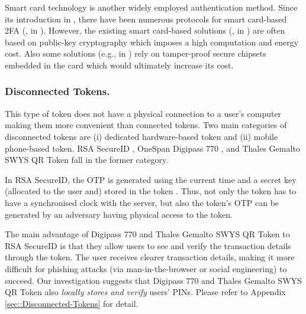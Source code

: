 Smart card technology is another widely employed authentication method. Since its introduction in \cite{chang1991remote}, there have been numerous protocols for smart card-based 2FA (\eg, in \cite{gupta2021machine,WangW18,radhakrishnan2022dependable}). %
%
However, the existing smart card-based solutions (\eg, in \cite{gupta2021machine,WangW18,radhakrishnan2022dependable}) are often based on public-key cryptography which imposes a high computation and energy cost. Also some solutions (e.g., in \cite{kim2009more}) rely on tamper-proof secure chipsets embedded in the card which would ultimately increase its cost. 







\subsubsection{Disconnected Tokens.}

This type of token does not have a physical connection to a user's computer making them more convenient than connected tokens. 
%
%
Two main categories of disconnected tokens are (i) dedicated hardware-based token and (ii) mobile phone-based token. 
%
RSA SecureID \cite{secureID}, OneSpan Digipass 770 \cite{Digipass-website}, and Thales Gemalto SWYS QR Token  \cite{Gemalto} fall in the former category. 



In RSA SecureID, the OTP is generated using the current time and a secret key (allocated to the user and) stored in the token \cite{biryukov2003cryptanalysis}. Thus, not only the token has to have a synchronised clock with the server, but also the token's OTP can be generated by an adversary having physical access to the token.%

The main advantage of  Digipass 770 and Thales Gemalto SWYS QR Token to RSA SecureID is that they allow users to see and verify the transaction details through the token. The user receives clearer transaction details, making it more difficult for phishing attacks (via man-in-the-browser or social engineering) to succeed. Our investigation suggests that Digipass 770 and Thales Gemalto SWYS QR Token also \emph{locally stores and verify} users' PINs. Please refer to Appendix \ref{sec::Disconnected-Tokens} for detail.  





